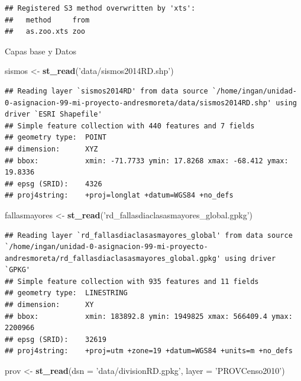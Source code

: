 \documentclass[11pt,]{article}
\newenvironment{Shaded}{\begin{snugshade}}{\end{snugshade}}
\newcommand{\KeywordTok}[1]{\textcolor[rgb]{0.13,0.29,0.53}{\textbf{#1}}}
\newcommand{\DataTypeTok}[1]{\textcolor[rgb]{0.13,0.29,0.53}{#1}}
\newcommand{\StringTok}[1]{\textcolor[rgb]{0.31,0.60,0.02}{#1}}
\newcommand{\NormalTok}[1]{#1}
\begin{document}
\begin{verbatim}
## Registered S3 method overwritten by 'xts':
##   method     from
##   as.zoo.xts zoo
\end{verbatim}

Capas base y Datos

\begin{Shaded}
\begin{Highlighting}[]
\NormalTok{sismos <-}\StringTok{ }\KeywordTok{st_read}\NormalTok{(}\StringTok{'data/sismos2014RD.shp'}\NormalTok{)}
\end{Highlighting}
\end{Shaded}

\begin{verbatim}
## Reading layer `sismos2014RD' from data source `/home/ingan/unidad-0-asignacion-99-mi-proyecto-andresmoreta/data/sismos2014RD.shp' using driver `ESRI Shapefile'
## Simple feature collection with 440 features and 7 fields
## geometry type:  POINT
## dimension:      XYZ
## bbox:           xmin: -71.7733 ymin: 17.8268 xmax: -68.412 ymax: 19.8336
## epsg (SRID):    4326
## proj4string:    +proj=longlat +datum=WGS84 +no_defs
\end{verbatim}

\begin{Shaded}
\begin{Highlighting}[]
\NormalTok{fallasmayores <-}\StringTok{ }\KeywordTok{st_read}\NormalTok{(}\StringTok{'rd_fallasdiaclasasmayores_global.gpkg'}\NormalTok{)}
\end{Highlighting}
\end{Shaded}

\begin{verbatim}
## Reading layer `rd_fallasdiaclasasmayores_global' from data source `/home/ingan/unidad-0-asignacion-99-mi-proyecto-andresmoreta/rd_fallasdiaclasasmayores_global.gpkg' using driver `GPKG'
## Simple feature collection with 935 features and 11 fields
## geometry type:  LINESTRING
## dimension:      XY
## bbox:           xmin: 183892.8 ymin: 1949825 xmax: 566409.4 ymax: 2200966
## epsg (SRID):    32619
## proj4string:    +proj=utm +zone=19 +datum=WGS84 +units=m +no_defs
\end{verbatim}

\begin{Shaded}
\begin{Highlighting}[]
\NormalTok{prov <-}\StringTok{ }\KeywordTok{st_read}\NormalTok{(}\DataTypeTok{dsn =} \StringTok{'data/divisionRD.gpkg'}\NormalTok{, }\DataTypeTok{layer =} \StringTok{'PROVCenso2010'}\NormalTok{)}
\end{Highlighting}
\end{Shaded}
\end{document}
